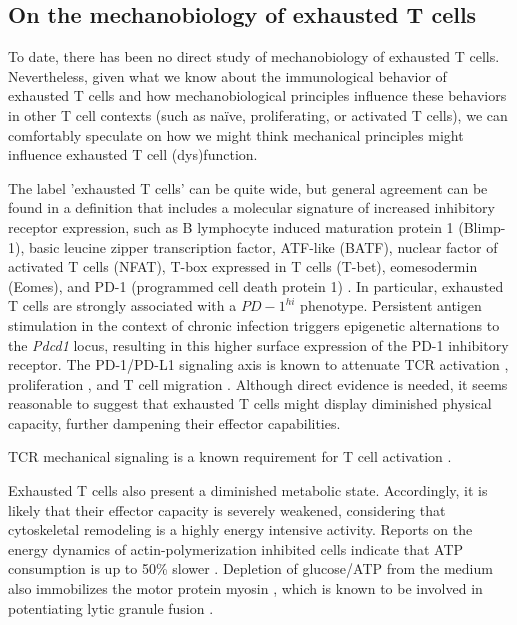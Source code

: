 \subsection{On the mechanobiology of exhausted T cells}

To date, there has been no direct study of mechanobiology of exhausted T cells. Nevertheless, given what we know about the immunological behavior of exhausted T cells and how mechanobiological principles influence these behaviors in other T cell contexts (such as na{\"i}ve, proliferating, or activated T cells), we can comfortably speculate on how we might think mechanical principles might influence exhausted T cell (dys)function.

The label 'exhausted T cells' can be quite wide, but general agreement can be found in a definition that includes a molecular signature of increased inhibitory receptor expression, such as B lymphocyte induced maturation protein 1 (Blimp-1), basic leucine zipper transcription factor, ATF-like (BATF), nuclear factor of activated T cells (NFAT), T-box expressed in T cells (T-bet), eomesodermin (Eomes), and PD-1 (programmed cell death protein 1) \cite{Wherry2011, Quigley2010, Doering2012, Wherry2007, Wang2012, Rangachari2012, Shin2009, Paley2012, Larsson2013}. In particular, exhausted T cells are strongly associated with a $PD-1^{hi}$ phenotype. Persistent antigen stimulation in the context of chronic infection triggers epigenetic alternations to the \textit{Pdcd1} locus, resulting in this higher surface expression of the PD-1 inhibitory receptor. The PD-1/PD-L1 signaling axis is known to attenuate TCR activation \cite{Mizuno2019}, proliferation \cite{Schietinger2014}, and T cell migration \cite{Zinselmeyer2013}. Although direct evidence is needed, it seems reasonable to suggest that exhausted T cells might display diminished physical capacity, further dampening their effector capabilities.

TCR mechanical signaling is a known requirement for T cell activation \cite{Hu2016}.

Exhausted T cells also present a diminished metabolic state. Accordingly, it is likely that their effector capacity is severely weakened, considering that cytoskeletal remodeling is a highly energy intensive activity. Reports on the energy dynamics of actin-polymerization inhibited cells indicate that ATP consumption is up to 50\% slower \cite{Bernstein2002, Ahmed2015}. Depletion of glucose/ATP from the medium also immobilizes the motor protein myosin \cite{Xu2014}, which is known to be involved in potentiating lytic granule fusion \cite{Basu2016}.


